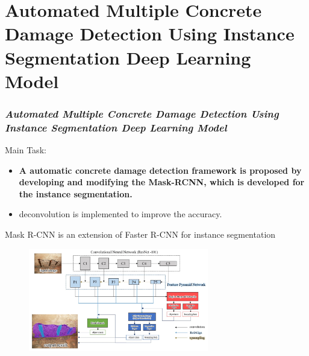 \section{Automated Multiple Concrete Damage Detection
Using Instance Segmentation Deep Learning Model}

\begin{frame}
    \frametitle{\textit{Automated Multiple Concrete Damage Detection
    Using Instance Segmentation Deep Learning Model}}

    \begin{block}{Main Task:}
        \begin{itemize}
            \item \textbf{A automatic concrete damage detection framework
                    is proposed by developing and modifying the Mask-RCNN, which
                    is developed for the instance
                segmentation. }
            \item deconvolution is implemented to improve the accuracy.
        \end{itemize}
    \end{block}

    \normalsize
    Mask R-CNN is an extension of Faster R-CNN for instance segmentation
    \begin{figure}[H]
        \centering
        \includegraphics[width=0.7\textwidth]{./imgs/Mask_RCNN}
    \end{figure}

\end{frame}
